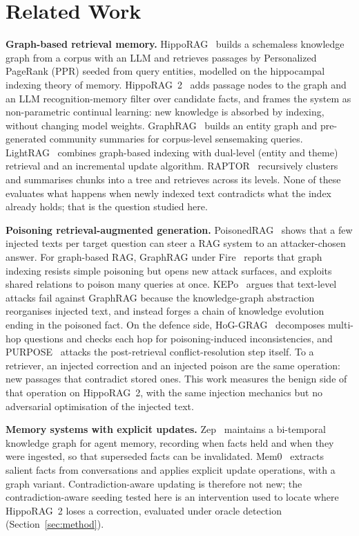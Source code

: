 \section{Related Work}\label{sec:related}

\textbf{Graph-based retrieval memory.}
HippoRAG~\cite{gutierrez2024hipporag} builds a schemaless knowledge graph from a corpus with an LLM and retrieves
passages by Personalized PageRank (PPR) seeded from query entities, modelled on the hippocampal indexing theory of
memory. HippoRAG~2~\cite{gutierrez2025hipporag2} adds passage nodes to the graph and an LLM recognition-memory filter
over candidate facts, and frames the system as non-parametric continual learning: new knowledge is absorbed by
indexing, without changing model weights. GraphRAG~\cite{edge2024graphrag} builds an entity graph and pre-generated
community summaries for corpus-level sensemaking queries. LightRAG~\cite{guo2024lightrag} combines graph-based
indexing with dual-level (entity and theme) retrieval and an incremental update algorithm. RAPTOR~\cite{sarthi2024raptor}
recursively clusters and summarises chunks into a tree and retrieves across its levels. None of these evaluates what
happens when newly indexed text contradicts what the index already holds; that is the question studied here.

\textbf{Poisoning retrieval-augmented generation.}
PoisonedRAG~\cite{zou2025poisonedrag} shows that a few injected texts per target question can steer a RAG system to an
attacker-chosen answer. For graph-based RAG, GraphRAG under Fire~\cite{liang2025graphragfire} reports that graph
indexing resists simple poisoning but opens new attack surfaces, and exploits shared relations to poison many queries at
once. KEPo~\cite{chen2026kepo} argues that text-level attacks fail against GraphRAG because the knowledge-graph
abstraction reorganises injected text, and instead forges a chain of knowledge evolution ending in the poisoned fact.
On the defence side, HoG-GRAG~\cite{noughabi2026defense} decomposes multi-hop questions and checks each hop for
poisoning-induced inconsistencies, and PURPOSE~\cite{wang2026purpose} attacks the post-retrieval conflict-resolution
step itself. To a retriever, an injected correction and an injected poison are the same operation: new passages that
contradict stored ones. This work measures the benign side of that operation on HippoRAG~2, with the same
injection mechanics but no adversarial optimisation of the injected text.

\textbf{Memory systems with explicit updates.}
Zep~\cite{rasmussen2025zep} maintains a bi-temporal knowledge graph for agent memory, recording when facts held and when
they were ingested, so that superseded facts can be invalidated. Mem0~\cite{chhikara2025mem0} extracts salient facts from
conversations and applies explicit update operations, with a graph variant. Contradiction-aware updating is therefore
not new; the contradiction-aware seeding tested here is an intervention used to locate where HippoRAG~2 loses a
correction, evaluated under oracle detection (Section~\ref{sec:method}).


